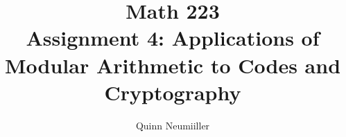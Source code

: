 


% 
% 

 
\title{Math 223 \\
Assignment 4: Applications of Modular Arithmetic to Codes and
Cryptography
}
\author{Quinn Neumiiller} %
 
\maketitle


